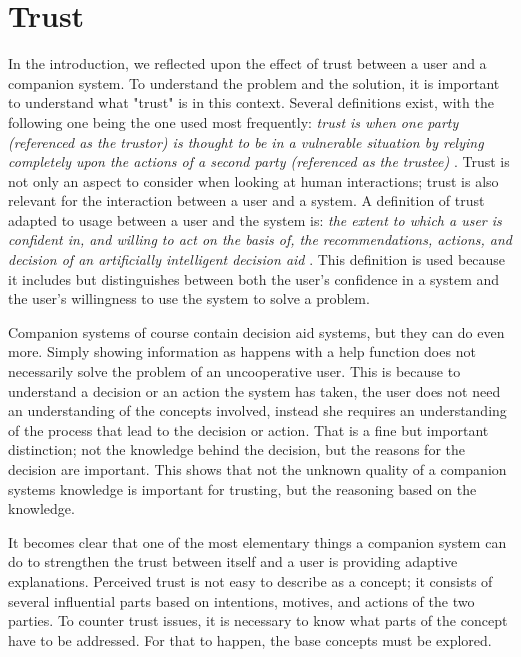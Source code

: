 \documentclass[a4paper]{article}
\begin{document}
\newpage
\section{Trust}

In the introduction, we reflected upon the effect of trust between a user and a companion system. To understand the problem and the solution, it is important to understand what "trust" is in this context. Several definitions exist, with the following one being the one used most frequently: {\it trust is when one party (referenced as the trustor) is thought to be in a vulnerable situation by relying completely upon the actions of a second party (referenced as the trustee)} \cite{lee2004trust}. Trust is not only an aspect to consider when looking at human interactions; trust is also relevant for the interaction between a user and a system. A definition of trust adapted to usage between a user and the system is: {\it the extent to which a user is confident in, and willing to act on the basis of, the recommendations, actions, and decision of an artificially intelligent decision aid} \cite{htc}. This definition is used because it includes but distinguishes between both the user's confidence in a system and the user's willingness to use the system to solve a problem.

Companion systems of course contain decision aid systems, but they can do even more. Simply showing information as happens with a help function does not necessarily solve the problem of an uncooperative user. This is because to understand a decision or an action the system has taken, the user does not need an understanding of the concepts involved, instead she requires an understanding of the process that lead to the decision or action. That is a fine but important distinction; not the knowledge behind the decision, but the reasons for the decision are important. This shows that not the unknown quality of a companion systems knowledge is important for trusting, but the reasoning based on the knowledge.

It becomes clear that one of the most elementary things a companion system can do to strengthen the trust between itself and a user is providing adaptive explanations. Perceived trust is not easy to describe as a concept; it consists of several influential parts based on intentions, motives, and actions of the two parties. To counter trust issues, it is necessary to know what parts of the concept have to be addressed. For that to happen, the base concepts must be explored.
\end{document}
